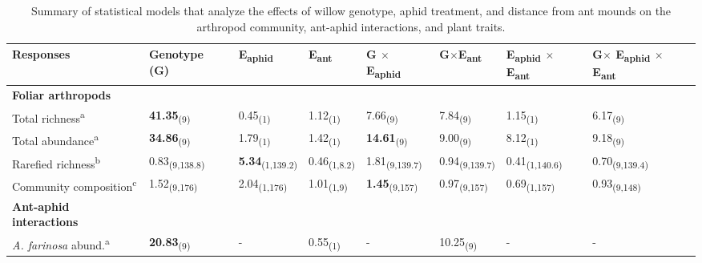 \documentclass[11pt]{article}
\begin{document}


\begin{table}%
\centering
\caption{Summary of statistical models that analyze the
effects of willow genotype, aphid treatment, and distance from ant
mounds on the arthropod community, ant-aphid interactions, and plant
traits.}
\label{TableA1}
\begin{tabular}{@{}llllllll@{}}
\toprule
Responses                & Genotype (G)   & E\textsubscript{aphid}        &  E\textsubscript{ant}        & G $\times$ E\textsubscript{aphid}      & G$\times$E\textsubscript{ant}        & E\textsubscript{aphid} $\times$ E\textsubscript{ant}   & G$\times$ E\textsubscript{aphid} $\times$ E\textsubscript{ant} \\ \midrule
\textbf{Foliar arthropods}        &                &               &             &               &               &               &               \\
Total richness\textsuperscript{a}         & \textbf{41.35}\textsubscript{(9)}       & 0.45\textsubscript{(1)}       & 1.12\textsubscript{(1)}     & 7.66\textsubscript{(9)}       & 7.84\textsubscript{(9)}       & 1.15\textsubscript{(1)}       & 6.17\textsubscript{(9)}       \\
Total abundance\textsuperscript{a}         & \textbf{34.86}\textsubscript{(9)}       & 1.79\textsubscript{(1)}       & 1.42\textsubscript{(1)}     & \textbf{14.61}\textsubscript{(9)}      & 9.00\textsubscript{(9)}       & 8.12\textsubscript{(1)}       & 9.18\textsubscript{(9)}       \\
Rarefied richness\textsuperscript{b}       & 0.83\textsubscript{(9,138.8)}  & \textbf{5.34}\textsubscript{(1,139.2)} & 0.46\textsubscript{(1,8.2)} & 1.81\textsubscript{(9,139.7)} & 0.94\textsubscript{(9,139.7)} & 0.41\textsubscript{(1,140.6)} & 0.70\textsubscript{(9,139.4)} \\
Community composition\textsuperscript{c}   & 1.52\textsubscript{(9,176)}    & 2.04\textsubscript{(1,176)}   & 1.01\textsubscript{(1,9)}   & \textbf{1.45}\textsubscript{(9,157)}   & 0.97\textsubscript{(9,157)}   & 0.69\textsubscript{(1,157)}   & 0.93\textsubscript{(9,148)}   \\
\textbf{Ant-aphid interactions}   &                &               &             &               &               &               &               \\
\textit{A. farinosa} abund.\textsuperscript{a}       & \textbf{20.83}\textsubscript{(9)}       & -             & 0.55\textsubscript{(1)}     & -             & 10.25\textsubscript{(9)}      & -             & -             \\

\end{tabular}
\end{table}
\end{document}
